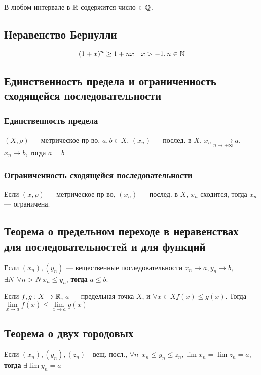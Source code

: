 В любом интервале в $\operatorname*{\mathbb{R}}$ содержится число $\in \operatorname*{\mathbb{Q}}$.

\subsection{Неравенство Бернулли}

$$(1+x)^n \geq 1+nx \quad x>-1, n\in\operatorname*{\mathbb{N}}$$

\subsection{Единственность предела и ограниченность сходящейся последовательности}

\subsubsection{Единственность предела}

$(X,\rho)$ --- метрическое пр-во, $a,b\in X$, $(x_n)$ --- послед. в $X$,
$x_n\xrightarrow[n\to +\infty]{} a$, $x_n\to b$,
тогда $a=b$

\subsubsection{Ограниченность сходящейся последовательности}

Если $(x,\rho)$ --- метрическое пр-во, $(x_n)$ --- послед. в $X$, $x_n$ сходится, тогда $x_n$ --- ограничена.

\subsection{Теорема о предельном переходе в неравенствах для последовательностей и для функций}

Если $(x_n),(y_n)$ --- вещественные последовательности $x_n\to a, y_n\to b$, $\exists N \ \ \forall n > N \ x_n\leq y_n$, \textbf{тогда} $a\leq b$.

Если $f, g:X\to \operatorname*{\mathbb{R}}$, $a$ --- предельная точка $X$, и $\forall x\in X f(x)\leq g(x)$. Тогда $\lim\limits_{x\to a}f(x)\leq \lim\limits_{x\to a}g(x)$ 

\subsection{Теорема о двух городовых}

Если $(x_n),(y_n),(z_n)$ - вещ. посл., $\forall n \ \ x_n\leq y_n\leq z_n, \lim x_n=\lim z_n =a$, \textbf{тогда} $\exists \lim y_n=a$

